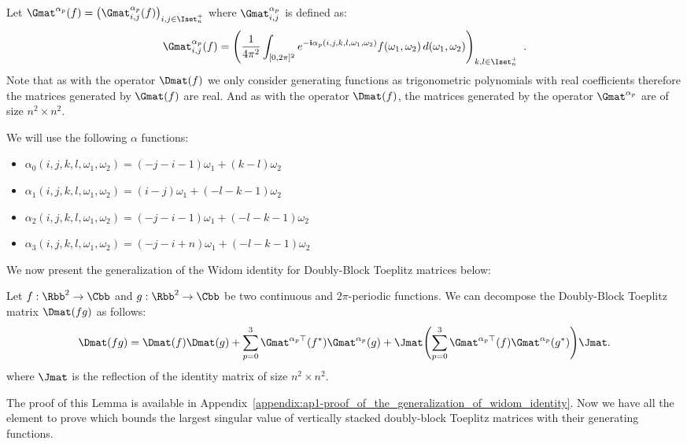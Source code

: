 Let $\Gmat^{\alpha_p} (f) = \leftmat \Gmat^{\alpha_p}_{i,j}(f) \rightmat_{i,j \in \Iset^+_n}$ where $\Gmat^{\alpha_p}_{i,j}$ is defined as:
\begin{equation}
  \Gmat^{\alpha_p}_{i,j}(f) =\leftmat \frac{1}{4\pi^{2}}\int_{[0,2\pi]^{2}} e^{-\ci \alpha_p(i, j, k, l, \omega_1, \omega_2)}  f(\omega_{1},\omega_{2})\,d(\omega_{1},\omega_{2})
  \rightmat_{k,l \in \Iset^+_n} \enspace.
\end{equation}
Note that as with the operator $\Dmat(f)$ we only consider generating functions as trigonometric polynomials with real coefficients therefore the matrices generated by $\Gmat(f)$ are real. 
And as with the operator $\Dmat(f)$, the matrices generated by the operator $\Gmat^{\alpha_p}$ are of size $n^2 \times n^2$. 

\noindent
We will use the following $\alpha$ functions:
\begin{itemize}
    \item[] $\alpha_0(i, j, k, l, \omega_1, \omega_2) = (-j-i-1)\omega_1 + (k-l)\omega_2$
    \item[] $\alpha_1(i, j, k, l, \omega_1, \omega_2) = (i-j)\omega_1 + (-l-k-1)\omega_2$
    \item[] $\alpha_2(i, j, k, l, \omega_1, \omega_2) = (-j-i-1)\omega_1 + (-l-k-1)\omega_2$
    \item[] $\alpha_3(i, j, k, l, \omega_1, \omega_2) = (-j-i+n)\omega_1 + (-l-k-1)\omega_2$
\end{itemize}

\noindent
We now present the generalization of the Widom identity for Doubly-Block Toeplitz matrices below:
\begin{lemma} \label{lemma:ch5-widom_idenity}
  Let $f:\Rbb^2 \rightarrow \Cbb$ and $g:\Rbb^2 \rightarrow \Cbb$ be two continuous and $2\pi$-periodic functions. 
  We can decompose the Doubly-Block Toeplitz matrix $\Dmat(fg)$ as follows:
  \begin{equation}
      \Dmat(fg) = \Dmat(f)\Dmat(g) + \sum_{p=0}^3 \Gmat^{\alpha_p \top}(f^*) \Gmat^{\alpha_p}(g) + \Jmat \left( \sum_{p=0}^3 \Gmat^{\alpha_p \top}(f) \Gmat^{\alpha_p }(g^*) \right) \Jmat.
  \end{equation}
  where $\Jmat$ is the reflection of the identity matrix of size $n^2 \times n^2$.
\end{lemma}

\noindent
The proof of this Lemma is available in Appendix~\ref{appendix:ap1-proof_of_the_generalization_of_widom_identity}.
Now we have all the element to prove  which bounds the largest singular value of vertically stacked doubly-block Toeplitz matrices with their generating functions. 

